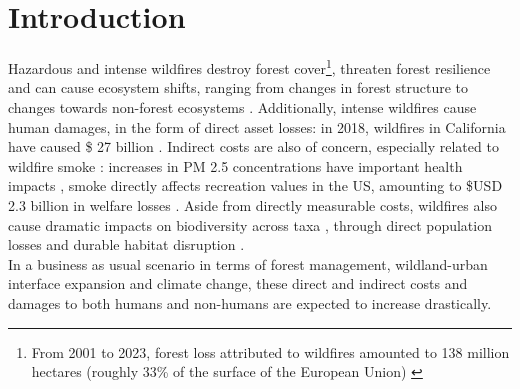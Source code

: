 \clearpage

\onehalfspacing
\section{Introduction}
\hspace*{1.5em}Hazardous and intense wildfires destroy forest cover\footnote{From 2001 to 2023, forest loss attributed to wildfires amounted to 138 million hectares (roughly 33\% of the surface of the European Union) \citep{tyukavina_global_2022}}, threaten forest resilience and can cause ecosystem shifts, ranging from changes in forest structure to changes towards non-forest ecosystems \citep{coop_wildfire-driven_2020}. 
Additionally, intense wildfires cause human damages, in the form of direct asset losses: in 2018, wildfires in California have caused \$ 27 billion \citep{wang_economic_2021}. Indirect costs are also of concern, especially related to wildfire smoke : increases in PM 2.5 concentrations have important health impacts \citep{burke_wildfire_2023, heft-neal_behavior_2023}, smoke directly affects recreation values in the US, amounting to \$USD 2.3 billion in welfare losses \citep{Gellman}. Aside from directly measurable costs, wildfires also cause dramatic impacts on biodiversity across taxa \citep{Wintle2020}, through direct population losses and durable habitat disruption \citep{Ayars2023}.
%
\\
\hspace*{1.5em}In a business as usual scenario in terms of forest management, wildland-urban interface expansion and climate change, these direct and indirect costs and damages to both humans and non-humans are expected to increase drastically.
%
\\

